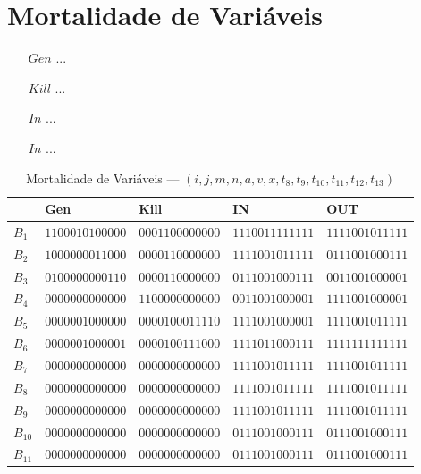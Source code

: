\section{Mortalidade de Vari\'aveis}

\begin{itemize}
  \item[$Gen$] ...
  \item[$Kill$] ...
  \item[$In$] ...
  \item[$In$] ...
\end{itemize}

\begin{table}[ht]
\centering
\begin{tabular}{l|l|l|l|l}
	& Gen & Kill & IN & OUT\\
\hline
$B_{1}$ &  $1100010100000$ & $0001100000000$ & $1110011111111$ & $1111001011111$\\
$B_{2}$ &  $1000000011000$ & $0000110000000$ & $1111001011111$ & $0111001000111$\\
$B_{3}$ &  $0100000000110$ & $0000110000000$ & $0111001000111$ & $0011001000001$\\
$B_{4}$ &  $0000000000000$ & $1100000000000$ & $0011001000001$ & $1111001000001$\\
$B_{5}$ &  $0000001000000$ & $0000100011110$ & $1111001000001$ & $1111001011111$\\
$B_{6}$ &  $0000001000001$ & $0000100111000$ & $1111011000111$ & $1111111111111$\\
$B_{7}$ &  $0000000000000$ & $0000000000000$ & $1111001011111$ & $1111001011111$\\
$B_{8}$ &  $0000000000000$ & $0000000000000$ & $1111001011111$ & $1111001011111$\\
$B_{9}$ &  $0000000000000$ & $0000000000000$ & $1111001011111$ & $1111001011111$\\
$B_{10}$ &  $0000000000000$ & $0000000000000$ & $0111001000111$ & $0111001000111$\\
$B_{11}$ &  $0000000000000$ & $0000000000000$ & $0111001000111$ & $0111001000111$\\
\end{tabular}
\caption{Mortalidade de Vari\'aveis --- $(i, j, m, n, a, v, x, t_{8}, t_{9}, t_{10}, t_{11}, t_{12}, t_{13})$}
\end{table}

